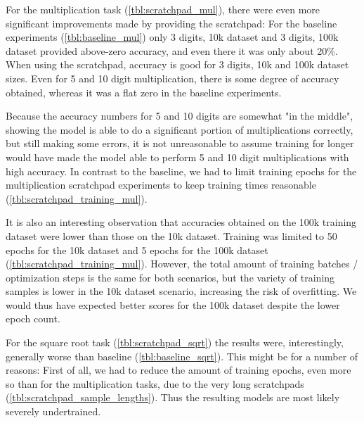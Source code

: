 
For the multiplication task (\cref{tbl:scratchpad_mul}), there were even more significant improvements made by providing the scratchpad: For the baseline experiments (\cref{tbl:baseline_mul}) only 3 digits, 10k dataset and 3 digits, 100k dataset provided above-zero accuracy, and even there it was only about 20\%. When using the scratchpad, accuracy is good for 
3 digits, 10k and 100k dataset sizes. Even for 5 and 10 digit multiplication, there is some degree of accuracy obtained, whereas it was a flat zero in the baseline experiments.

Because the accuracy numbers for 5 and 10 digits are somewhat "in the middle", showing the model is able to do a significant portion of multiplications correctly, but still making some errors, it is not unreasonable to assume training for longer would have made the model able to perform 5 and 10 digit multiplications with high accuracy. In contrast to the baseline, we had to limit training epochs for the multiplication scratchpad experiments to keep training times reasonable (\cref{tbl:scratchpad_training_mul}).

It is also an interesting observation that accuracies obtained on the 100k training dataset were lower than those on the 10k dataset. Training was limited to 50 epochs for the 10k dataset and 5 epochs for the 100k dataset (\cref{tbl:scratchpad_training_mul}). However, the total amount of training batches / optimization steps is the same for both scenarios, but the variety of training samples is lower in the 10k dataset scenario, increasing the risk of overfitting.
We would thus have expected better scores for the 100k dataset despite the lower epoch count.


For the square root task (\cref{tbl:scratchpad_sqrt}) the results were, interestingly, generally worse than baseline (\cref{tbl:baseline_sqrt}). This might be for a number of reasons:
First of all, we had to reduce the amount of training epochs, even more so than for the multiplication tasks, due to the very long scratchpads (\cref{tbl:scratchpad_sample_lengths}). Thus the resulting models are most likely severely undertrained.

